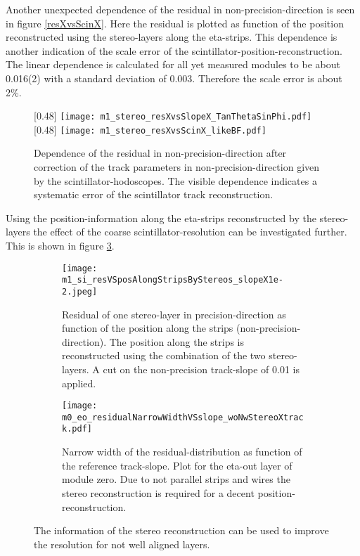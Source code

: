 \documentclass[
twoside,            %
BCOR1.4cm,          %
10pt,               %
headings=normal,    %
headsepline,        %
clearplainpage,		%
final,              %
div=14,
open=right,
bibliography=toc
]{scrreprt}
\begin{document}
Another unexpected dependence of the residual in non-precision-direction is seen in figure \ref{resXvsScinX}.
Here the residual is plotted as function of the position reconstructed using the stereo-layers along the eta-strips.
This dependence is another indication of the scale error of the scintillator-position-reconstruction.
The linear dependence is calculated for all yet measured modules to be about 0.016(2) with a standard deviation of 0.003.
Therefore the scale error is about 2\%.

\begin{figure}[!h]
	\centering
	[0.48\textwidth]
	{\texttt{[image: m1\_stereo\_resXvsSlopeX\_TanThetaSinPhi.pdf]}}
	\hfill
	[0.48\textwidth]
	{\texttt{[image: m1\_stereo\_resXvsScinX\_likeBF.pdf]}}
	\vspace{-2mm}
	\caption{
		Dependence of the residual in non-precision-direction after correction of the track parameters in non-precision-direction given by the scintillator-hodoscopes.
		The visible dependence indicates a systematic error of the scintillator track reconstruction.
	}
\end{figure}

Using the position-information along the eta-strips reconstructed by the stereo-layers the effect of the coarse scintillator-resolution can be investigated further.
This is shown in figure \ref{stereoXimprovement}.

\begin{figure}[!h]
	\begin{subfigure}[b]{0.48\textwidth}
		\centering
		\texttt{[image: m1\_si\_resVSposAlongStripsByStereos\_slopeX1e-2.jpeg]}
		\caption{
			Residual of one stereo-layer in precision-direction as function of the position along the strips (non-precision-direction).
			The position along the strips is reconstructed using the combination of the two stereo-layers.
			A cut on the non-precision track-slope of 0.01 is applied.
		}
		\label{scintillatorSegmentation} 
	\end{subfigure}
	\hfill
	\begin{subfigure}[b]{0.48\textwidth}
		\centering
		\texttt{[image: m0\_eo\_residualNarrowWidthVSslope\_woNwStereoXtrack.pdf]}
		\caption{
			Narrow width of the residual-distribution as function of the reference track-slope.
			Plot for the eta-out layer of module zero.
			Due to not parallel strips and wires the stereo reconstruction is required for a decent position-reconstruction.
		}
		\label{m1_eo_residualNarrowWidthVSslope_woNwStereoXtrack} 
	\end{subfigure}
	\vspace{-2mm}
	\caption{
		The information of the stereo reconstruction can be used to improve the resolution for not well aligned layers.
	}
	\label{stereoXimprovement}
	\vspace{-2mm}
\end{figure}
\end{document}
